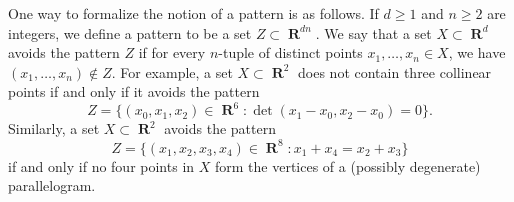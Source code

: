 \documentclass[dvipsnames,letterpaper,12pt]{article}
\numberwithin{equation}{section}
\theoremstyle{plain}
\theoremstyle{remark}
\DeclareMathOperator{\RR}{\mathbf{R}}
\begin{document}
One way to formalize the notion of a pattern is as follows. If $d \geq 1$ and $n \geq 2$ are integers, we define a pattern to be a set $Z \subset \RR^{dn}$. We say that a set $X \subset \RR^d$ avoids the pattern $Z$ if for every $n$-tuple of distinct points $x_1, \ldots, x_n\in X$, we have $(x_1,\ldots,x_n) \not \in Z$.
%
%
%
For example, a set $X \subset \RR^2$ does not contain three collinear points if and only if it avoids the pattern
%
\[ Z = \{ (x_0,x_1,x_2) \in \RR^6 \colon \det(x_1 - x_0, x_2 - x_0) = 0 \}. \]
%
Similarly, a set $X \subset \RR^2$ avoids the pattern
%
\[ Z = \{ (x_1, x_2,x_3,x_4) \in \RR^8 \colon x_1 + x_4 = x_2 + x_3 \} \]
%
if and only if no four points in $X$ form the vertices of a (possibly degenerate) parallelogram.
\end{document}
